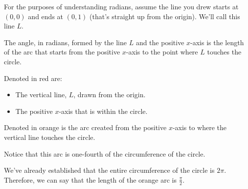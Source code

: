For the purposes of understanding radians, assume the line you drew starts at $(0,0)$ and ends at $(0,1)$ (that's straight up from the origin). We'll call this line $L$. 

The angle, in radians, formed by the line $L$ and the positive $x$-axis is the length of the arc that starts from the positive $x$-axis to the point where $L$ touches the circle.
\begin{center}
    \begin{minipage}[c]{0.33\linewidth}
    \end{minipage}
    \begin{minipage}[c]{0.66\linewidth}
        Denoted in red are:
        \begin{itemize}
            \item The vertical line, $L$, drawn from the origin.
            \item The positive $x$-axis that is within the circle.
        \end{itemize}
        Denoted in orange is the arc created from the positive $x$-axis to where the vertical line touches the circle.
    \end{minipage}
\end{center}
Notice that this arc is one-fourth of the circumference of the circle.

We've already established that the entire circumference of the circle is $2\pi$. Therefore, we can say that the length of the orange arc is $\frac{\pi}{2}$.

